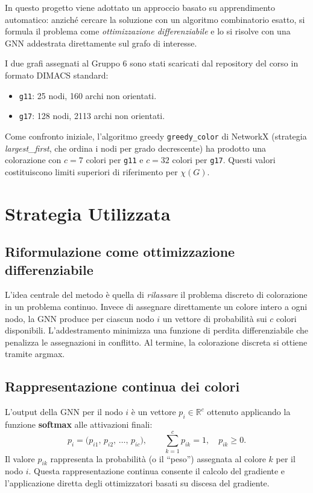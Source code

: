 \documentclass[11pt, a4paper]{article}
\begin{document}
In questo progetto viene adottato un approccio basato su apprendimento automatico:
anziché cercare la soluzione con un algoritmo combinatorio esatto, si formula il problema
come \emph{ottimizzazione differenziabile} e lo si risolve con una GNN addestrata
direttamente sul grafo di interesse.

I due grafi assegnati al Gruppo 6 sono stati scaricati dal repository del corso in formato
DIMACS standard:
\begin{itemize}
    \item \texttt{g11}: 25 nodi, 160 archi non orientati.
    \item \texttt{g17}: 128 nodi, 2113 archi non orientati.
\end{itemize}
Come confronto iniziale, l'algoritmo greedy \texttt{greedy\_color} di NetworkX (strategia
\textit{largest\_first}, che ordina i nodi per grado decrescente) ha prodotto una
colorazione con $c = 7$ colori per \texttt{g11} e $c = 32$ colori per \texttt{g17}.
Questi valori costituiscono limiti superiori di riferimento per $\chi(G)$.

\section{Strategia Utilizzata}

\subsection*{Riformulazione come ottimizzazione differenziabile}

L'idea centrale del metodo è quella di \emph{rilassare} il problema discreto di
colorazione in un problema continuo. Invece di assegnare direttamente un colore intero a
ogni nodo, la GNN produce per ciascun nodo $i$ un vettore di probabilità sui $c$ colori
disponibili. L'addestramento minimizza una funzione di perdita differenziabile che
penalizza le assegnazioni in conflitto. Al termine, la colorazione discreta si ottiene
tramite argmax.

\subsection*{Rappresentazione continua dei colori}

L'output della GNN per il nodo $i$ è un vettore $p_i \in \mathbb{R}^c$ ottenuto
applicando la funzione \textbf{softmax} alle attivazioni finali:
\begin{equation}
    p_i = \bigl(p_{i1},\, p_{i2},\, \dots,\, p_{ic}\bigr), \qquad
    \sum_{k=1}^c p_{ik} = 1, \quad p_{ik} \geq 0.
\end{equation}
Il valore $p_{ik}$ rappresenta la probabilità (o il ``peso'') assegnata al colore $k$
per il nodo $i$. Questa rappresentazione continua consente il calcolo del gradiente e
l'applicazione diretta degli ottimizzatori basati su discesa del gradiente.
\end{document}
